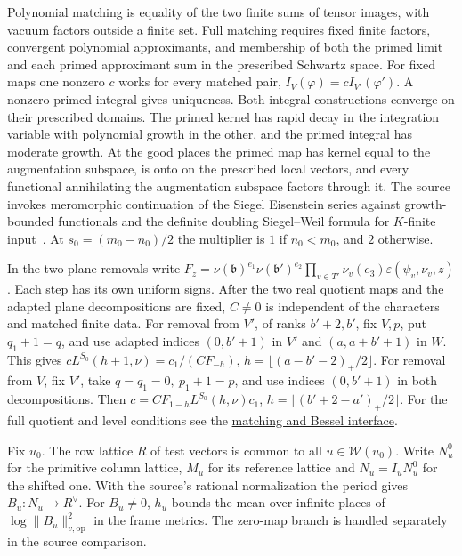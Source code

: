\documentclass[letterpaper,11pt]{article}
\newcommand{\paperpage}[2]{\href{https://zenodo.org/records/24413008/files/alpoge-rh-exposition.pdf\#page=#1}{#2}}
\begin{document}
Polynomial matching is equality of the two finite sums of tensor images, with vacuum factors outside a finite set. Full matching requires fixed finite factors, convergent polynomial approximants, and membership of both the primed limit and each primed approximant sum in the prescribed Schwartz space. For fixed maps one nonzero \(c\) works for every matched pair, \(I_V(\varphi)=cI_{V'}(\varphi')\). A nonzero primed integral gives uniqueness. Both integral constructions converge on their prescribed domains. The primed kernel has rapid decay in the integration variable with polynomial growth in the other, and the primed integral has moderate growth. At the good places the primed map has kernel equal to the augmentation subspace, is onto on the prescribed local vectors, and every functional annihilating the augmentation subspace factors through it. The source invokes meromorphic continuation of the Siegel Eisenstein series against growth-bounded functionals and the definite doubling Siegel--Weil formula for \(K\)-finite input~\cite{sw,rallis}. At \(s_0=(m_0-n_0)/2\) the multiplier is \(1\) if \(n_0<m_0\), and \(2\) otherwise.

In the two plane removals write \(F_z=\nu(\mathfrak b)^{e_1}\nu(\mathfrak b')^{e_2}\prod_{v\in T'}\nu_v(e_3)\varepsilon(\psi_v,\nu_v,z)\). Each step has its own uniform signs. After the two real quotient maps and the adapted plane decompositions are fixed, \(C\ne0\) is independent of the characters and matched finite data. For removal from \(V'\), of ranks \(b'+2,b'\), fix \(V,p\), put \(q_1+1=q\), and use adapted indices \((0,b'+1)\) in \(V'\) and \((a,a+b'+1)\) in \(W\). This gives \(cL^{S_0}(h+1,\nu)=c_1/(CF_{-h})\), \(h=\lfloor(a-b'-2)_+/2\rfloor\). For removal from \(V\), fix \(V'\), take \(q=q_1=0,\ p_1+1=p\), and use indices \((0,b'+1)\) in both decompositions. Then \(c=CF_{1-h}L^{S_0}(h,\nu)c_1\), \(h=\lfloor(b'+2-a')_+/2\rfloor\). For the full quotient and level conditions see the \paperpage{14}{matching and Bessel interface}.

Fix \(u_0\). The row lattice \(R\) of test vectors is common to all \(u\in\mathcal W(u_0)\). Write \(N^0_u\) for the primitive column lattice, \(M_u\) for its reference lattice and \(N_u=I_uN^0_u\) for the shifted one. With the source's rational normalization the period gives \(B_u:N_u\to R^\vee\). For \(B_u\ne0\), \(h_u\) bounds the mean over infinite places of \(\log\|B_u\|_{v,\mathrm{op}}^2\) in the frame metrics. The zero-map branch is handled separately in the source comparison.
\end{document}
